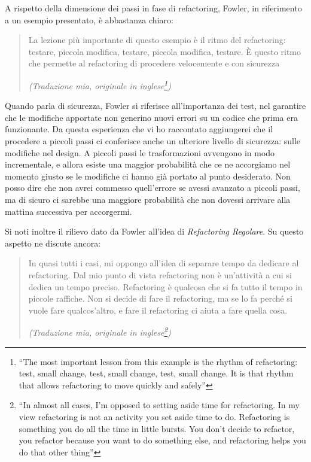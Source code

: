 \documentclass[12pt]{report}
\begin{document}
A rispetto della dimensione dei passi in fase di refactoring, Fowler, in
riferimento a un esempio presentato, è abbastanza chiaro:

\begin{quote}
La lezione più importante di questo esempio è il ritmo del refactoring:
testare, piccola modifica, testare, piccola modifica, testare. È questo
ritmo che permette al refactoring di procedere velocemente
e con sicurezza\cite{fowler2002}

\flushright\textit{(Traduzione mia, originale in inglese\footnote{
``The most important lesson from this example is the rhythm of refactoring:
test, small change, test, small change, test, small change. It is that
rhythm that allows refactoring to move quickly and safely''
})
}
\end{quote}

Quando parla di sicurezza, Fowler si riferisce all'importanza dei test,
nel garantire che le modifiche apportate non generino nuovi errori
su un codice che prima era funzionante. Da questa esperienza che vi ho
raccontato aggiungerei che il procedere a piccoli passi ci conferisce
anche un ulteriore livello di sicurezza: sulle modifiche nel design. 
A piccoli passi le trasformazioni avvengono in modo incrementale,
e allora esiste una maggior probabilità che ce ne accorgiamo nel momento
giusto se le modifiche ci hanno già portato al punto desiderato. 
Non posso dire che non avrei commesso quell'errore se avessi avanzato
a piccoli passi, ma di sicuro ci sarebbe una maggiore probabilità che
non dovessi arrivare alla mattina successiva per accorgermi.

Si noti inoltre il rilievo dato da Fowler all'idea di 
\textit{Refactoring Regolare}. Su questo aspetto ne discute
ancora:

\begin{quote}
In quasi tutti i casi, mi oppongo all'idea di separare tempo da dedicare
al refactoring. Dal mio punto di vista refactoring non è un'attività a cui
si dedica un tempo preciso. Refactoring è qualcosa che si fa tutto il tempo
in piccole raffiche. Non si decide di fare il refactoring, ma se lo fa
perché si vuole fare qualcos'altro, e fare il refactoring ci aiuta a 
fare quella cosa\cite{fowler2002}.

\flushright
\textit{(Traduzione mia, originale in inglese\footnote{
``In almost all cases, I'm opposed to setting aside time for refactoring.
In my view refactoring is not an activity you set aside time to do.
Refactoring is something you do all the time in little bursts. You don't
decide to refactor, you refactor because you want to do something else,
and refactoring helps you do that other thing''
})
}
\end{quote}
\end{document}
